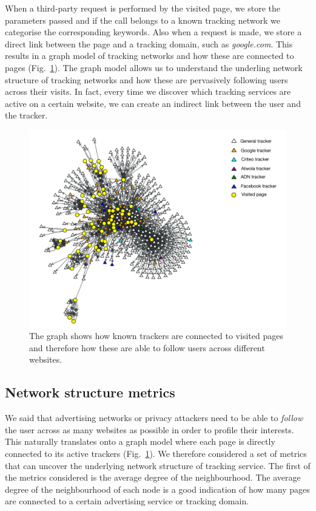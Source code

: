 When a third-party request is performed by the visited page, we store the parameters passed and if the call belongs to a known tracking network we categorise the corresponding keywords. Also when a request is made, we store a direct link between the page and a tracking domain, such as \emph{google.com}. This results in a graph model of tracking networks and how these are connected to pages (Fig.~\ref{fig:graph-map}). The graph model allows us to understand the underling network structure of tracking networks and how these are pervasively following users across their visits. In fact, every time we discover which tracking services are active on a certain website, we can create an indirect link between the user and the tracker.


\begin{figure}
\includegraphics[width=\textwidth]{figures/graph-map.png}
\caption[Connections between trackers and visited pages]{The graph shows how known trackers are connected to visited pages and therefore how these are able to follow users across different websites.}
\label{fig:graph-map}
\end{figure}

\subsection{Network structure metrics}
\noindent
We said that advertising networks or privacy attackers need to be able to \emph{follow} the user across as many websites as possible in order to profile their interests. This naturally translates onto a graph model where each page is directly connected to its active trackers (Fig.~\ref{fig:graph-map}).
We therefore considered a set of metrics that can uncover the underlying network structure of tracking service. The first of the metrics considered is the average degree of the neighbourhood. The average degree of the neighbourhood of each node is a good indication of how many pages are connected to a certain advertising service or tracking domain.

